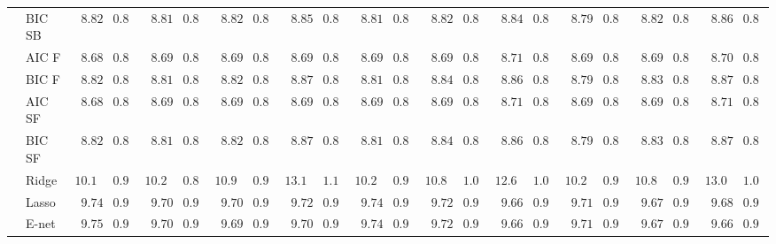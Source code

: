 \begin{tabular}{ll|ll|llllll|llllll|llllll}
 & BIC SB  & $\phantom{0}8.82$ & $0.83$ & $\phantom{0}8.81$ & $0.84$ & $\phantom{0}8.82$ & $0.81$ & $\phantom{0}8.85$ & $0.84$ & $\phantom{0}8.81$ & $0.83$ & $\phantom{0}8.82$ & $0.82$ & $\phantom{0}8.84$ & $0.85$ & $\phantom{0}8.79$ & $0.83$ & $\phantom{0}8.82$ & $0.82$ & $\phantom{0}8.86$ & $0.83$ \\
 & AIC F  & $\phantom{0}8.68$ & $0.80$ & $\phantom{0}8.69$ & $0.82$ & $\phantom{0}8.69$ & $0.82$ & $\phantom{0}8.69$ & $0.82$ & $\phantom{0}8.69$ & $0.81$ & $\phantom{0}8.69$ & $0.82$ & $\phantom{0}8.71$ & $0.82$ & $\phantom{0}8.69$ & $0.81$ & $\phantom{0}8.69$ & $0.81$ & $\phantom{0}8.70$ & $0.82$ \\
 & BIC F  & $\phantom{0}8.82$ & $0.83$ & $\phantom{0}8.81$ & $0.84$ & $\phantom{0}8.82$ & $0.81$ & $\phantom{0}8.87$ & $0.83$ & $\phantom{0}8.81$ & $0.83$ & $\phantom{0}8.84$ & $0.83$ & $\phantom{0}8.86$ & $0.85$ & $\phantom{0}8.79$ & $0.83$ & $\phantom{0}8.83$ & $0.82$ & $\phantom{0}8.87$ & $0.84$ \\
 & AIC SF  & $\phantom{0}8.68$ & $0.80$ & $\phantom{0}8.69$ & $0.82$ & $\phantom{0}8.69$ & $0.82$ & $\phantom{0}8.69$ & $0.82$ & $\phantom{0}8.69$ & $0.81$ & $\phantom{0}8.69$ & $0.82$ & $\phantom{0}8.71$ & $0.82$ & $\phantom{0}8.69$ & $0.81$ & $\phantom{0}8.69$ & $0.81$ & $\phantom{0}8.71$ & $0.82$ \\
 & BIC SF  & $\phantom{0}8.82$ & $0.83$ & $\phantom{0}8.81$ & $0.84$ & $\phantom{0}8.82$ & $0.81$ & $\phantom{0}8.87$ & $0.83$ & $\phantom{0}8.81$ & $0.83$ & $\phantom{0}8.84$ & $0.83$ & $\phantom{0}8.86$ & $0.85$ & $\phantom{0}8.79$ & $0.83$ & $\phantom{0}8.83$ & $0.82$ & $\phantom{0}8.87$ & $0.84$ \\
 & Ridge  & $10.11$ & $0.95$ & $10.25$ & $0.87$ & $10.96$ & $0.91$ & $13.15$ & $1.14$ & $10.26$ & $0.94$ & $10.89$ & $1.02$ & $12.66$ & $1.06$ & $10.27$ & $0.93$ & $10.84$ & $0.91$ & $13.06$ & $1.07$ \\
 & Lasso  & $\phantom{0}9.74$ & $0.97$ & $\phantom{0}9.70$ & $0.97$ & $\phantom{0}9.70$ & $0.96$ & $\phantom{0}9.72$ & $0.98$ & $\phantom{0}9.74$ & $0.97$ & $\phantom{0}9.72$ & $0.97$ & $\phantom{0}9.66$ & $0.99$ & $\phantom{0}9.71$ & $0.98$ & $\phantom{0}9.67$ & $0.99$ & $\phantom{0}9.68$ & $0.97$ \\
 & E-net  & $\phantom{0}9.75$ & $0.99$ & $\phantom{0}9.70$ & $0.97$ & $\phantom{0}9.69$ & $0.97$ & $\phantom{0}9.70$ & $0.97$ & $\phantom{0}9.74$ & $0.99$ & $\phantom{0}9.72$ & $0.98$ & $\phantom{0}9.66$ & $0.98$ & $\phantom{0}9.71$ & $0.97$ & $\phantom{0}9.67$ & $0.99$ & $\phantom{0}9.66$ & $0.97$ \\

\end{tabular}
